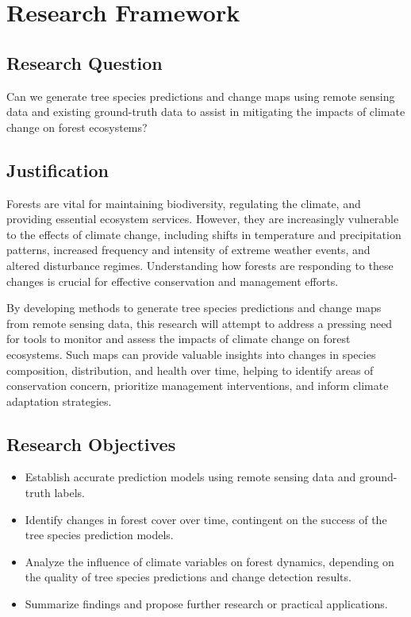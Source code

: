 \chapter{Research Framework}
\label{chapter:frame}
\section{Research Question}

Can we generate tree species predictions and change maps using remote sensing data and existing ground-truth data to assist in mitigating the impacts of climate change on forest ecosystems?

\section{Justification}

Forests are vital for maintaining biodiversity, regulating the climate, and providing essential ecosystem services. However, they are increasingly vulnerable to the effects of climate change, including shifts in temperature and precipitation patterns, increased frequency and intensity of extreme weather events, and altered disturbance regimes. Understanding how forests are responding to these changes is crucial for effective conservation and management efforts.

By developing methods to generate tree species predictions and change maps from remote sensing data, this research will attempt to address a pressing need for tools to monitor and assess the impacts of climate change on forest ecosystems. Such maps can provide valuable insights into changes in species composition, distribution, and health over time, helping to identify areas of conservation concern, prioritize management interventions, and inform climate adaptation strategies.

\section{Research Objectives}

\begin{itemize}
\item Establish accurate prediction models using remote sensing data and ground-truth labels.
\item Identify changes in forest cover over time, contingent on the success of the tree species prediction models.
\item Analyze the influence of climate variables on forest dynamics, depending on the quality of tree species predictions and change detection results.
\item Summarize findings and propose further research or practical applications.
\end{itemize}

